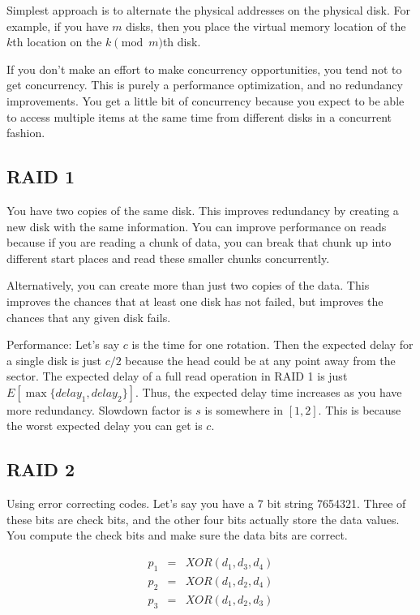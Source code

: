 \documentclass[psamsfonts]{amsart}
\begin{document}
Simplest approach is to alternate the physical addresses on the physical disk. For example, if you have $m$ disks, then you place the virtual memory location of the $k$th location on the $k \pmod{m}$th disk.

If you don't make an effort to make concurrency opportunities, you tend not to get concurrency. This is purely a performance optimization, and no redundancy improvements. You get a little bit of concurrency because you expect to be able to access multiple items at the same time from different disks in a concurrent fashion.

\subsection{RAID 1}

You have two copies of the same disk. This improves redundancy by creating a new disk with the same information. You can improve performance on reads because if you are reading a chunk of data, you can break that chunk up into different start places and read these smaller chunks concurrently.

Alternatively, you can create more than just two copies of the data. This improves the chances that at least one disk has not failed, but improves the chances that any given disk fails.

Performance: Let's say $c$ is the time for one rotation. Then the expected delay for a single disk is just $c/2$ because the head could be at any point away from the sector. The expected delay of a full read operation in RAID 1 is just $E[\max \{delay_1, delay_2 \}]$. Thus, the expected delay time increases as you have more redundancy. Slowdown factor is $s$ is somewhere in $[1,2]$. This is because the worst expected delay you can get is $c$.

\subsection{RAID 2}

Using error correcting codes. Let's say you have a 7 bit string 7654321. Three of these bits are check bits, and the other four bits actually store the data values. You compute the check bits and make sure the data bits are correct.

\begin{eqnarray}
  p_1 &=& XOR(d_1, d_3, d_4) \\
  p_2 &=& XOR(d_1, d_2, d_4) \\
  p_3 &=& XOR(d_1, d_2, d_3)
\end{eqnarray}
\end{document}
